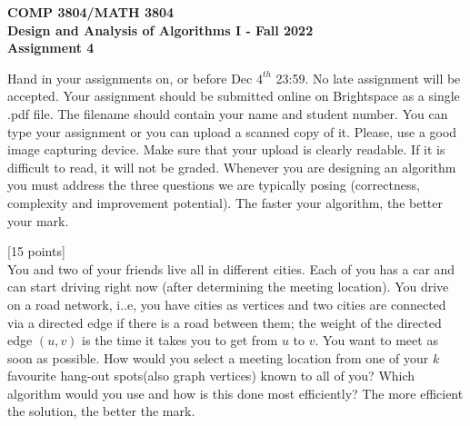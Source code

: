 \documentclass[12pt]{article}
\newcounter{ques}
\newenvironment{question}{\stepcounter{ques}{\noindent\bf Question \arabic{ques}:}}{\vspace{5mm}}
\begin{document}
 

\begin{center} \large\bf
COMP 3804/MATH 3804\\
Design and Analysis of Algorithms I  - 
Fall  2022\\
Assignment 4
\end{center} 

Hand in your assignments on, or before 
Dec $4^{th}$ 23:59. No late assignment will be accepted. Your assignment should be submitted online on Brightspace as a single .pdf file.  The filename should contain your name and student number. You can type your assignment or you can upload a scanned copy of it.  Please, use a good image capturing device. Make sure that your upload is clearly readable. If it is difficult to read, it will not be graded. Whenever you are designing an algorithm you must address the three questions we are 
typically posing (correctness, complexity and improvement potential).
The faster your 
algorithm, the better your mark.     \\

\vspace{1em} 

\begin{question}[15 points]\\
You and two of your friends live all in different cities. Each of you has a car  and can start driving right now (after determining the meeting location). You drive on a road network, i..e, you have cities as vertices and two cities are connected via a directed edge if there is a road between them; the weight of the directed edge $(u,v)$ is the time it takes you to get from $u$ to $v$. You want to meet as soon as possible. How would you select a meeting  location from one of your  $k$ favourite hang-out  spots(also graph vertices) known to all of you? Which algorithm would you use and how is this done most efficiently? The more efficient  the solution, the better the mark.
\end{question} 
\end{document}
